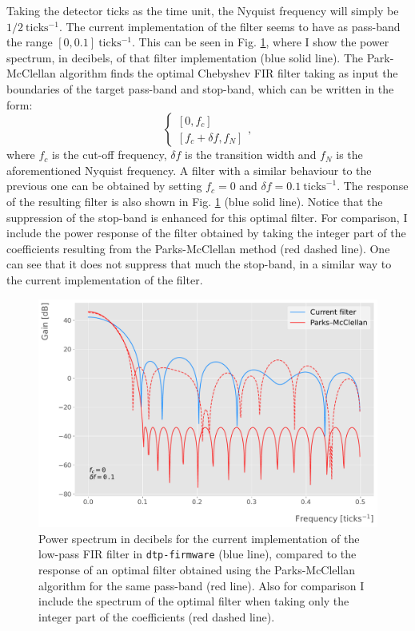 Taking the detector ticks as the time unit, the Nyquist frequency will simply be $1/2 \ \mathrm{ticks^{-1}}$. The current implementation of the filter seems to have as pass-band the range $[0,0.1] \ \mathrm{ticks^{-1}}$. This can be seen in Fig. \ref{fig:filter_comp}, where I show the power spectrum, in decibels, of that filter implementation (blue solid line). The Park-McClellan algorithm finds the optimal Chebyshev FIR filter \cite{Weinberg1960} taking as input the boundaries of the target pass-band and stop-band, which can be written in the form:
\begin{equation}
	\left\{ \begin{array}{c}
		\left[0, f_{c}\right] \\
		\left[ f_{c} + \delta f, f_{N}\right]
	\end{array} \right. ,
\end{equation}
where $f_{c}$ is the cut-off frequency, $\delta f$ is the transition width and $f_{N}$ is the aforementioned Nyquist frequency. A filter with a similar behaviour to the previous one can be obtained by setting $f_{c} = 0$ and $\delta f = 0.1 \ \mathrm{ticks}^{-1}$. The response of the resulting filter is also shown in Fig. \ref{fig:filter_comp} (blue solid line). Notice that the suppression of the stop-band is enhanced for this optimal filter. For comparison, I include the power response of the filter obtained by taking the integer part of the coefficients resulting from the Parks-McClellan method (red dashed line). One can see that it does not suppress that much the stop-band, in a similar way to the current implementation of the filter.

\begin{figure}[h!]
	\centering
	\includegraphics[width=0.8\linewidth]{Images/Matched_Filter/filter_comp}
	\caption[Power spectra for the current low-pass FIR filter and the optimal filter obtained using the Parks-McClellan algorithm.]{Power spectrum in decibels for the current implementation of the low-pass FIR filter in \texttt{dtp-firmware} (blue line), compared to the response of an optimal filter obtained using the Parks-McClellan algorithm for the same pass-band (red line). Also for comparison I include the spectrum of the optimal filter when taking only the integer part of the coefficients (red dashed line).}
	\label{fig:filter_comp}
\end{figure}

